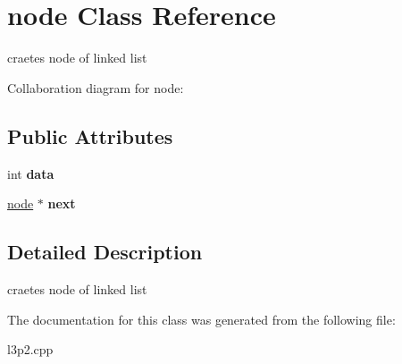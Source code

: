 \hypertarget{classnode}{}\section{node Class Reference}
\label{classnode}


craetes node of linked list  




Collaboration diagram for node\+:
\subsection*{Public Attributes}
\begin{DoxyCompactItemize}
\item 
\mbox{\label{classnode_a2d890bb9f6af0ffd73fe79b21124c2a2}} 
int {\bfseries data}
\item 
\mbox{\label{classnode_aad210fa7c160a49f6b9a3ffee592a2bc}} 
\hyperlink{classnode}{node} $\ast$ {\bfseries next}
\end{DoxyCompactItemize}


\subsection{Detailed Description}
craetes node of linked list 

The documentation for this class was generated from the following file\+:\begin{DoxyCompactItemize}
\item 
l3p2.\+cpp\end{DoxyCompactItemize}
